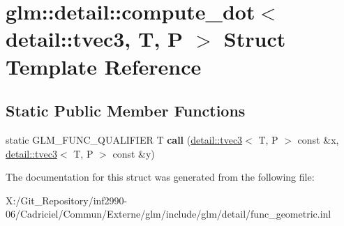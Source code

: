 \hypertarget{structglm_1_1detail_1_1compute__dot_3_01detail_1_1tvec3_00_01_t_00_01_p_01_4}{\section{glm\-:\-:detail\-:\-:compute\-\_\-dot$<$ detail\-:\-:tvec3, T, P $>$ Struct Template Reference}
\label{structglm_1_1detail_1_1compute__dot_3_01detail_1_1tvec3_00_01_t_00_01_p_01_4}
}
\subsection*{Static Public Member Functions}
\begin{DoxyCompactItemize}
\item 
\hypertarget{structglm_1_1detail_1_1compute__dot_3_01detail_1_1tvec3_00_01_t_00_01_p_01_4_a2320996e972e6955b19c23ab96c77626}{static G\-L\-M\-\_\-\-F\-U\-N\-C\-\_\-\-Q\-U\-A\-L\-I\-F\-I\-E\-R T {\bfseries call} (\hyperlink{structglm_1_1detail_1_1tvec3}{detail\-::tvec3}$<$ T, P $>$ const \&x, \hyperlink{structglm_1_1detail_1_1tvec3}{detail\-::tvec3}$<$ T, P $>$ const \&y)}\label{structglm_1_1detail_1_1compute__dot_3_01detail_1_1tvec3_00_01_t_00_01_p_01_4_a2320996e972e6955b19c23ab96c77626}

\end{DoxyCompactItemize}


The documentation for this struct was generated from the following file\-:\begin{DoxyCompactItemize}
\item 
X\-:/\-Git\-\_\-\-Repository/inf2990-\/06/\-Cadriciel/\-Commun/\-Externe/glm/include/glm/detail/func\-\_\-geometric.\-inl\end{DoxyCompactItemize}
